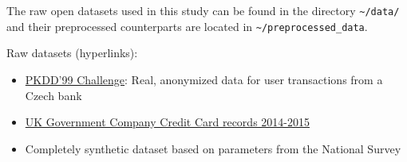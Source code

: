 \documentclass[]{article}
\begin{document}
The raw open datasets used in this study can be found in the directory
\texttt{\textasciitilde{}/data/} and their preprocessed counterparts are
located in \texttt{\textasciitilde{}/preprocessed\_data}.

Raw datasets (hyperlinks): 
\begin{itemize}
    \item \href{http://lisp.vse.cz/pkdd99/berka.htm}{PKDD'99
    Challenge}: Real, anonymized data for user transactions from a Czech
    bank
    \item 
    \href{https://www.europeandataportal.eu/data/en/dataset/corporate-credit-card-transaction-2014-15}{UK
    Government Company Credit Card records 2014-2015}
    \item Completely synthetic
    dataset based on parameters from the National Survey
\end{itemize}
\end{document}
